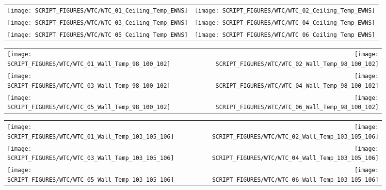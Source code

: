 \begin{figure}[!ht]
\begin{tabular*}{\textwidth}{l@{\extracolsep{\fill}}r}
\texttt{[image: SCRIPT\_FIGURES/WTC/WTC\_01\_Ceiling\_Temp\_EWNS]} &
\texttt{[image: SCRIPT\_FIGURES/WTC/WTC\_02\_Ceiling\_Temp\_EWNS]} \\
\texttt{[image: SCRIPT\_FIGURES/WTC/WTC\_03\_Ceiling\_Temp\_EWNS]} &
\texttt{[image: SCRIPT\_FIGURES/WTC/WTC\_04\_Ceiling\_Temp\_EWNS]} \\
\texttt{[image: SCRIPT\_FIGURES/WTC/WTC\_05\_Ceiling\_Temp\_EWNS]} &
\texttt{[image: SCRIPT\_FIGURES/WTC/WTC\_06\_Ceiling\_Temp\_EWNS]}
\end{tabular*}
\label{NIST_WTC_Ceiling_EWNS}
\end{figure}

\clearpage

\begin{figure}[!ht]
\begin{tabular*}{\textwidth}{l@{\extracolsep{\fill}}r}
\texttt{[image: SCRIPT\_FIGURES/WTC/WTC\_01\_Wall\_Temp\_98\_100\_102]} &
\texttt{[image: SCRIPT\_FIGURES/WTC/WTC\_02\_Wall\_Temp\_98\_100\_102]} \\
\texttt{[image: SCRIPT\_FIGURES/WTC/WTC\_03\_Wall\_Temp\_98\_100\_102]} &
\texttt{[image: SCRIPT\_FIGURES/WTC/WTC\_04\_Wall\_Temp\_98\_100\_102]} \\
\texttt{[image: SCRIPT\_FIGURES/WTC/WTC\_05\_Wall\_Temp\_98\_100\_102]} &
\texttt{[image: SCRIPT\_FIGURES/WTC/WTC\_06\_Wall\_Temp\_98\_100\_102]}
\end{tabular*}
\label{NIST_WTC_Wall_98_100_102}
\end{figure}

\begin{figure}[!ht]
\begin{tabular*}{\textwidth}{l@{\extracolsep{\fill}}r}
\texttt{[image: SCRIPT\_FIGURES/WTC/WTC\_01\_Wall\_Temp\_103\_105\_106]} &
\texttt{[image: SCRIPT\_FIGURES/WTC/WTC\_02\_Wall\_Temp\_103\_105\_106]} \\
\texttt{[image: SCRIPT\_FIGURES/WTC/WTC\_03\_Wall\_Temp\_103\_105\_106]} &
\texttt{[image: SCRIPT\_FIGURES/WTC/WTC\_04\_Wall\_Temp\_103\_105\_106]} \\
\texttt{[image: SCRIPT\_FIGURES/WTC/WTC\_05\_Wall\_Temp\_103\_105\_106]} &
\texttt{[image: SCRIPT\_FIGURES/WTC/WTC\_06\_Wall\_Temp\_103\_105\_106]}
\end{tabular*}
\label{NIST_WTC_Wall_103_105_106}
\end{figure}

